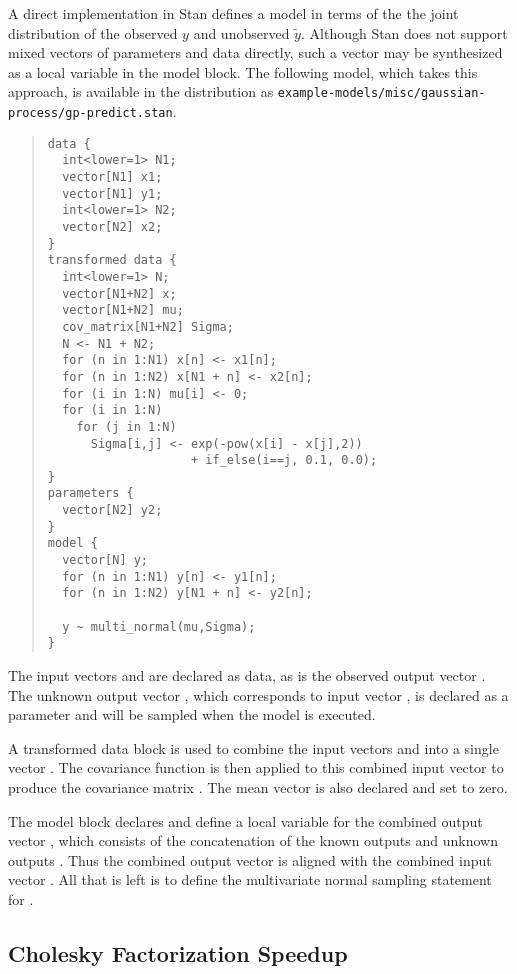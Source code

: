 A direct implementation in Stan defines a model in terms of the the
joint distribution of the observed $y$ and unobserved $\tilde{y}$.
Although Stan does not support mixed vectors of parameters and data
directly, such a vector may be synthesized as a local variable in the
model block.  The following model, which takes this approach, is
available in the distribution as
\nolinkurl{example-models/misc/gaussian-process/gp-predict.stan}.  
%
\begin{quote}
\begin{Verbatim}[fontsize=\small]
data {
  int<lower=1> N1;     
  vector[N1] x1; 
  vector[N1] y1;
  int<lower=1> N2;
  vector[N2] x2;
}
transformed data {
  int<lower=1> N;
  vector[N1+N2] x;
  vector[N1+N2] mu;
  cov_matrix[N1+N2] Sigma;
  N <- N1 + N2;
  for (n in 1:N1) x[n] <- x1[n];
  for (n in 1:N2) x[N1 + n] <- x2[n];
  for (i in 1:N) mu[i] <- 0;
  for (i in 1:N) 
    for (j in 1:N)
      Sigma[i,j] <- exp(-pow(x[i] - x[j],2)) 
                    + if_else(i==j, 0.1, 0.0);
}
parameters {
  vector[N2] y2;
}
model {
  vector[N] y;
  for (n in 1:N1) y[n] <- y1[n];
  for (n in 1:N2) y[N1 + n] <- y2[n];

  y ~ multi_normal(mu,Sigma);
}
\end{Verbatim}
\end{quote}
%
The input vectors  and  are declared as data, as is
the observed output vector .  The unknown output vector
, which corresponds to input vector , is declared as
a parameter and will be sampled when the model is executed.  

A transformed data block is used to combine the input vectors
 and  into a single vector .  The covariance
function is then applied to this combined input vector to produce the
covariance matrix .  The mean vector  is also
declared and set to zero.

The model block declares and define a local variable for the combined
output vector , which consists of the concatenation of the
known outputs  and unknown outputs .  Thus the
combined output vector  is aligned with the combined
input vector .  All that is left is to define the multivariate
normal sampling statement for .

\subsection{Cholesky Factorization Speedup}

